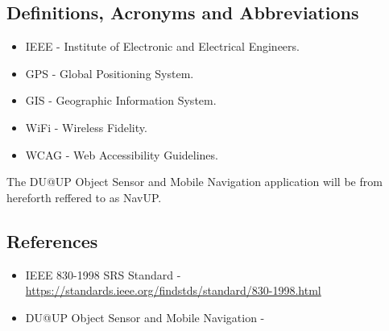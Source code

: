 \documentclass{article}
\begin{document}
		
	\subsection{Definitions, Acronyms and Abbreviations}
		\begin{itemize}
			\item IEEE - Institute of Electronic and Electrical Engineers.
			\item GPS - Global Positioning System.
			\item GIS - Geographic Information System.
			\item WiFi - Wireless Fidelity.
			\item WCAG - Web Accessibility Guidelines.
		\end{itemize}
		
		The DU@UP Object Sensor and Mobile Navigation application will be from hereforth reffered to as NavUP.
		
	\subsection{References}
		\begin{itemize}
			\item IEEE 830-1998 SRS Standard - \url{https://standards.ieee.org/findstds/standard/830-1998.html}
			\item DU@UP Object Sensor and Mobile Navigation - \url{}
		\end{itemize}
	
\newpage
%
%	
\end{document}
